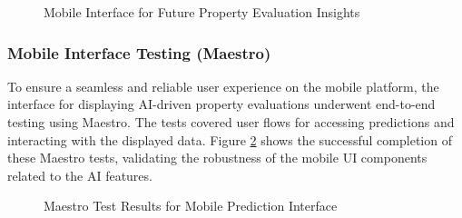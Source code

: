 \begin{figure}[htbp]
    \centering
    \caption{Mobile Interface for Future Property Evaluation Insights}
    \label{fig:mobile-future-evaluation}
\end{figure}


\subsubsection{Mobile Interface Testing (Maestro)}
To ensure a seamless and reliable user experience on the mobile platform, the interface for displaying AI-driven property evaluations underwent end-to-end testing using Maestro. The tests covered user flows for accessing predictions and interacting with the displayed data. Figure \ref{fig:maestro-tests-mobile} shows the successful completion of these Maestro tests, validating the robustness of the mobile UI components related to the AI features.

\begin{figure}[htbp]
    \centering
    \caption{Maestro Test Results for Mobile Prediction Interface}
    \label{fig:maestro-tests-mobile}
\end{figure}
\newpage





